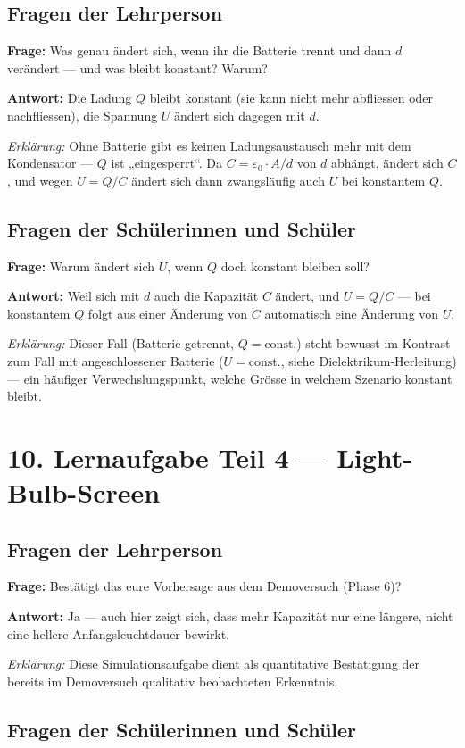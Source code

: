 \documentclass[11pt,a4paper]{article}
\newcommand{\Frage}[1]{\textbf{Frage:} #1\par}
\newcommand{\Antwort}[1]{\textbf{Antwort:} #1\par}
\newcommand{\Erklaerung}[1]{\textit{Erklärung:} #1}
\newcommand{\FrageBlock}[3]{\Frage{#1}\Antwort{#2}\Erklaerung{#3}\vspace{0.6em}}
\begin{document}
\subsection*{Fragen der Lehrperson}

\FrageBlock{Was genau ändert sich, wenn ihr die Batterie trennt und dann $d$ verändert --- und was bleibt konstant? Warum?}
{Die Ladung $Q$ bleibt konstant (sie kann nicht mehr abfliessen oder nachfliessen), die Spannung $U$ ändert sich dagegen mit $d$.}
{Ohne Batterie gibt es keinen Ladungsaustausch mehr mit dem Kondensator --- $Q$ ist „eingesperrt“. Da $C=\varepsilon_0\cdot A/d$ von $d$ abhängt, ändert sich $C$, und wegen $U=Q/C$ ändert sich dann zwangsläufig auch $U$ bei konstantem $Q$.}

\subsection*{Fragen der Schülerinnen und Schüler}

\FrageBlock{Warum ändert sich $U$, wenn $Q$ doch konstant bleiben soll?}
{Weil sich mit $d$ auch die Kapazität $C$ ändert, und $U=Q/C$ --- bei konstantem $Q$ folgt aus einer Änderung von $C$ automatisch eine Änderung von $U$.}
{Dieser Fall (Batterie getrennt, $Q=\text{const.}$) steht bewusst im Kontrast zum Fall mit angeschlossener Batterie ($U=\text{const.}$, siehe Dielektrikum-Herleitung) --- ein häufiger Verwechslungspunkt, welche Grösse in welchem Szenario konstant bleibt.}

\section*{10. Lernaufgabe Teil 4 --- Light-Bulb-Screen}

\subsection*{Fragen der Lehrperson}

\FrageBlock{Bestätigt das eure Vorhersage aus dem Demoversuch (Phase 6)?}
{Ja --- auch hier zeigt sich, dass mehr Kapazität nur eine längere, nicht eine hellere Anfangsleuchtdauer bewirkt.}
{Diese Simulationsaufgabe dient als quantitative Bestätigung der bereits im Demoversuch qualitativ beobachteten Erkenntnis.}

\subsection*{Fragen der Schülerinnen und Schüler}
\end{document}
